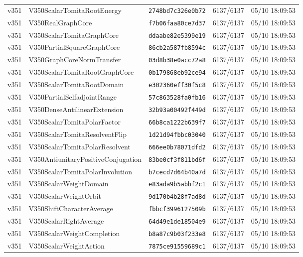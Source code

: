 \documentclass[11pt]{article}
\theoremstyle{definition}\newtheorem{deriv}{Derivação}
\begin{document}
{\begin{longtable}{@{}lllll@{}}
v351 & V350ScalarTomitaRootEnergy & \texttt{2748bd7c326e0b72} & 6137/6137 & 05/10 18:09:53 \\
v351 & V350RealGraphCore & \texttt{f7b06faa80ce7d37} & 6137/6137 & 05/10 18:09:53 \\
v351 & V350ScalarTomitaGraphCore & \texttt{ddaabe82e5399e19} & 6137/6137 & 05/10 18:09:53 \\
v351 & V350PartialSquareGraphCore & \texttt{86cb2a587fb8594c} & 6137/6137 & 05/10 18:09:53 \\
v351 & V350GraphCoreNormTransfer & \texttt{03d8b38e0acc72a8} & 6137/6137 & 05/10 18:09:53 \\
v351 & V350ScalarTomitaRootGraphCore & \texttt{0b179868eb92ce94} & 6137/6137 & 05/10 18:09:53 \\
v351 & V350ScalarTomitaRootDomain & \texttt{e302360eff30f5c8} & 6137/6137 & 05/10 18:09:53 \\
v351 & V350PartialSelfadjointRange & \texttt{57c863528fa0fb16} & 6137/6137 & 05/10 18:09:53 \\
v351 & V350DenseAntilinearExtension & \texttt{32b93a00492f449d} & 6137/6137 & 05/10 18:09:53 \\
v351 & V350ScalarTomitaPolarFactor & \texttt{66b8ca1222b639f7} & 6137/6137 & 05/10 18:09:53 \\
v351 & V350ScalarTomitaResolventFlip & \texttt{1d21d94fbbc03040} & 6137/6137 & 05/10 18:09:53 \\
v351 & V350ScalarTomitaPolarResolvent & \texttt{666ee0b78071dfd2} & 6137/6137 & 05/10 18:09:53 \\
v351 & V350AntiunitaryPositiveConjugation & \texttt{83be0cf3f811bd6f} & 6137/6137 & 05/10 18:09:53 \\
v351 & V350ScalarTomitaPolarInvolution & \texttt{b7cecd7d64b40a7d} & 6137/6137 & 05/10 18:09:53 \\
v351 & V350ScalarWeightDomain & \texttt{e83ada9b5abbf2c1} & 6137/6137 & 05/10 18:09:53 \\
v351 & V350ScalarWeightOrbit & \texttt{9d170b4b28f7ad8d} & 6137/6137 & 05/10 18:09:53 \\
v351 & V350ShiftCharacterAverage & \texttt{fbbcf3996127509b} & 6137/6137 & 05/10 18:09:53 \\
v351 & V350ScalarRightAverage & \texttt{64d49e1de18504e9} & 6137/6137 & 05/10 18:09:53 \\
v351 & V350ScalarWeightCompletion & \texttt{b8a87c9b03f233e8} & 6137/6137 & 05/10 18:09:53 \\
v351 & V350ScalarWeightAction & \texttt{7875ce91559689c1} & 6137/6137 & 05/10 18:09:53 \\

\end{longtable}}
\end{document}
